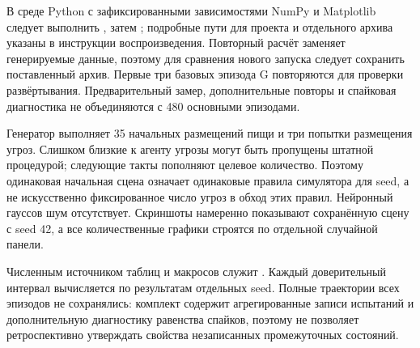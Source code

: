 \documentclass[11pt]{article}
\begin{document}
В среде Python с зафиксированными зависимостями NumPy и Matplotlib следует выполнить , затем ; подробные пути для проекта и отдельного архива указаны в инструкции воспроизведения. Повторный расчёт заменяет генерируемые данные, поэтому для сравнения нового запуска следует сохранить поставленный архив. Первые три базовых эпизода G повторяются для проверки развёртывания. Предварительный замер, дополнительные повторы и спайковая диагностика не объединяются с 480 основными эпизодами.

Генератор выполняет 35 начальных размещений пищи и три попытки размещения угроз. Слишком близкие к агенту угрозы могут быть пропущены штатной процедурой; следующие такты пополняют целевое количество. Поэтому одинаковая начальная сцена означает одинаковые правила симулятора для seed, а не искусственно фиксированное число угроз в обход этих правил. Нейронный гауссов шум отсутствует. Скриншоты намеренно показывают сохранённую сцену с seed 42, а все количественные графики строятся по отдельной случайной панели.

Численным источником таблиц и макросов служит . Каждый доверительный интервал вычисляется по результатам отдельных seed. Полные траектории всех эпизодов не сохранялись: комплект содержит агрегированные записи испытаний и дополнительную диагностику равенства спайков, поэтому не позволяет ретроспективно утверждать свойства незаписанных промежуточных состояний.



\end{document}
